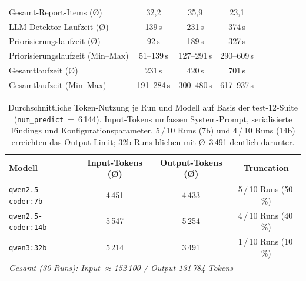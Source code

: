 \begin{table}[htbp]
{\begin{tabular}{|l|c|c|c|}
Gesamt-Report-Items (Ø)           & 32{,}2           & 35{,}9             & 23{,}1 \\
\ac{LLM}-Detektor-Laufzeit (Ø)         & 139\,s           & 231\,s             & 374\,s \\
Priorisierungslaufzeit (Ø)        & 92\,s            & 189\,s             & 327\,s \\
Priorisierungslaufzeit (Min--Max) & 51--139\,s       & 127--291\,s        & 290--609\,s \\
Gesamtlaufzeit (Ø)                & 231\,s           & 420\,s             & 701\,s \\
Gesamtlaufzeit (Min--Max)         & 191--284\,s      & 300--480\,s        & 617--937\,s \\
\hline
\end{tabular}
}%
\label{tab:modell_summary_12}
\end{table}

\clearpage

\label{app:token_economy_12}

\begin{table}[htbp]
\centering
\setlength{\tabcolsep}{4pt}
\renewcommand{\arraystretch}{1.2}
\caption[Token-Nutzung pro Modell (test-12)]{Durchschnittliche Token-Nutzung je Run und Modell auf Basis der test-12-Suite (\texttt{num\_predict}~=~6\,144). Input-Tokens umfassen System-Prompt, serialisierte Findings und Konfigurationsparameter. 5\,/\,10 Runs (7b) und 4\,/\,10 Runs (14b) erreichten das Output-Limit; 32b-Runs blieben mit Ø~3\,491 deutlich darunter.}
\begin{tabular}{|l|c|c|c|}
\hline
\textbf{Modell} & \textbf{Input-Tokens (Ø)} & \textbf{Output-Tokens (Ø)} & \textbf{Truncation} \\
\hline
\texttt{qwen2.5-coder:7b} & 4\,451 & 4\,433 &  5\,/\,10 Runs (50\,\%) \\
\hline
\texttt{qwen2.5-coder:14b} & 5\,547 & 5\,254 &  4\,/\,10 Runs (40\,\%) \\
\hline
\texttt{qwen3:32b} & 5\,214 & 3\,491 &  1\,/\,10 Runs (10\,\%) \\
\hline
\multicolumn{4}{|l|}{\textit{Gesamt (30 Runs): Input $\approx$152\,100 / Output 131\,784 Tokens}} \\
\hline
\end{tabular}
\label{tab:token_economy}
\end{table}

\label{app:laufzeit_effizienz}\label{app:effizienz_metriken_12}

